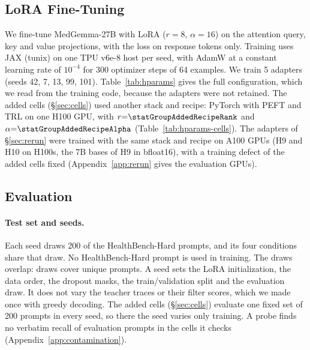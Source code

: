 \documentclass{article}
\newcommand{\hbhard}{HealthBench-Hard}
\begin{document}
\subsection{LoRA Fine-Tuning}

We fine-tune MedGemma-27B with LoRA ($r{=}8$, $\alpha{=}16$) on the attention query, key and value
projections, with the loss on response tokens only. Training uses JAX (tunix) on one TPU v6e-8
host per seed, with AdamW at a constant learning rate of $10^{-4}$ for 300 optimizer steps of 64
examples. We train 5 adapters (seeds 42, 7, 13, 99, 101). Table~\ref{tab:hparams} gives the full
configuration, which we read from the training code, because the adapters were not retained. The
added cells (\S\ref{sec:cells}) used another stack and recipe: PyTorch with PEFT and TRL on one
H100 GPU, with $r{=}\statGroupAddedRecipeRank$ and $\alpha{=}\statGroupAddedRecipeAlpha$ (Table~\ref{tab:hparams-cells}).
The adapters of \S\ref{sec:rerun} were trained with the same stack and recipe on A100 GPUs (H9 and
H10 on H100s, the 7B bases of H9 in bfloat16), with a
training defect of the added cells fixed (Appendix~\ref{app:rerun} gives the evaluation GPUs).

\subsection{Evaluation}
\label{sec:eval}

\paragraph{Test set and seeds.} Each seed draws 200 of the \statHBMedGemmaMayPopulationPrompts{} \hbhard{} prompts,
and its four conditions share that draw. No \hbhard{} prompt is used in training. The draws
overlap: \statHBMedGemmaMayPromptDraws{} draws cover \statHBMedGemmaMayPrompts{} unique prompts. A seed sets the LoRA
initialization, the data order, the dropout masks, the train/validation split and the evaluation
draw. It does not vary the teacher traces or their filter scores, which we made once with greedy
decoding. The added cells (\S\ref{sec:cells}) evaluate one fixed set of 200 prompts in every seed,
so there the seed varies only training. A probe finds no verbatim recall of evaluation prompts in
the cells it checks (Appendix~\ref{app:contamination}).
\end{document}
